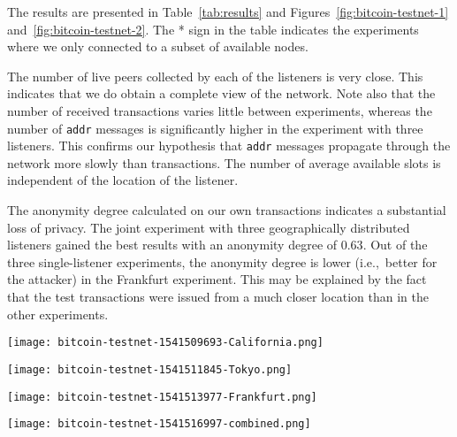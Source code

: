 The results are presented in Table~\ref{tab:results} and Figures~\ref{fig:bitcoin-testnet-1} and~\ref{fig:bitcoin-testnet-2}.
The * sign in the table indicates the experiments where we only connected to a subset of available nodes.

The number of live peers collected by each of the listeners is very close.
This indicates that we do obtain a complete view of the network.
Note also that the number of received transactions varies little between experiments, whereas the number of \texttt{addr} messages is significantly higher in the experiment with three listeners.
This confirms our hypothesis that \texttt{addr} messages propagate through the network more slowly than transactions.
The number of average available slots is independent of the location of the listener.

The anonymity degree calculated on our own transactions indicates a substantial loss of privacy.
The joint experiment with three geographically distributed listeners gained the best results with an anonymity degree of $0.63$.
Out of the three single-listener experiments, the anonymity degree is lower (i.e.,~better for the attacker) in the Frankfurt experiment.
This may be explained by the fact that the test transactions were issued from a much closer location than in the other experiments.


\begin{figure*}
	\centering
	\begin{minipage}{0.5\textwidth}
		\centering
		\texttt{[image: bitcoin-testnet-1541509693-California.png]}
		\caption{Bitcoin testnet (California)}
	\end{minipage}\hfill
	\begin{minipage}{0.5\textwidth}
		\centering
		\texttt{[image: bitcoin-testnet-1541511845-Tokyo.png]}
		\caption{Bitcoin testnet (Tokyo)}
	\end{minipage}\hfill
	\label{fig:bitcoin-testnet-1}
\end{figure*}

\begin{figure*}
	\centering
	\begin{minipage}{0.5\textwidth}
		\centering
		\texttt{[image: bitcoin-testnet-1541513977-Frankfurt.png]}
		\caption{Bitcoin testnet (Frankfurt)}
	\end{minipage}\hfill
	\begin{minipage}{0.5\textwidth}
		\centering
		\texttt{[image: bitcoin-testnet-1541516997-combined.png]}
		\caption{Bitcoin testnet (combined)}
	\end{minipage}\hfill
	\label{fig:bitcoin-testnet-2}
\end{figure*}


